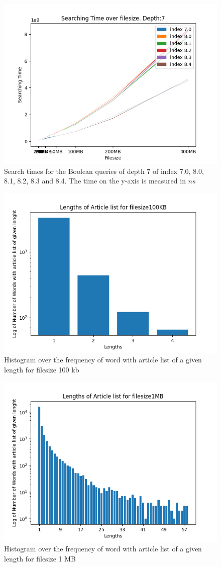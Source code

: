 \begin{figure}[H]
    \centering
    \includegraphics[width=.8\textwidth]{LaTeX/Pictures/Results/BooleanSearchDepth6.png}
    \caption{Search times for the Boolean queries of depth 7 of index 7.0, 8.0, 8.1, 8.2, 8.3 and 8.4. The time on the y-axis is measured in $ns$}
    \label{fig:BPindextime23456}
\end{figure}

\begin{figure}[ht!]
    \centering
    \includegraphics[width=.5\textwidth]{LaTeX/Pictures/Results/ArticleLengthg100KB.png}
    \caption{Histogram over the frequency of word with article list of a given length for filesize 100 kb}
    \label{fig:Articlelength01}
\end{figure}

\begin{figure}[ht!]
    \centering
    \includegraphics[width=.5\textwidth]{LaTeX/Pictures/Results/ArticleLengthg1MB.png}
    \caption{Histogram over the frequency of word with article list of a given length for filesize 1 MB}
    \label{fig:Articlelength1}
\end{figure}

